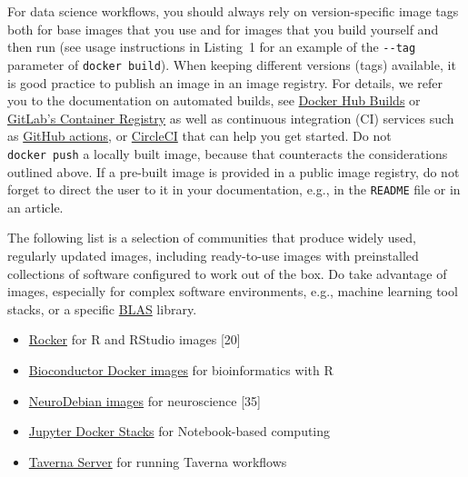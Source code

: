\documentclass[10pt,letterpaper]{article}
\providecommand{\tightlist}{%
  \setlength{\itemsep}{0pt}\setlength{\parskip}{0pt}}
\begin{document}
For data science workflows, you should always rely on version-specific
image tags both for base images that you use and for images that you
build yourself and then run (see usage instructions in Listing~1 for an
example of the \texttt{-\/-tag} parameter of \texttt{docker\ build}).
When keeping different versions (tags) available, it is good practice to
publish an image in an image registry. For details, we refer you to the
documentation on automated builds, see
\href{https://docs.docker.com/docker-hub/builds/}{Docker Hub Builds} or
\href{https://docs.gitlab.com/ee/user/packages/container_registry/index.html\#build-and-push-images}{GitLab's
Container Registry} as well as continuous integration (CI) services such
as
\href{https://github.com/actions/starter-workflows/tree/master/ci}{GitHub
actions}, or
\href{https://circleci.com/orbs/registry/orb/circleci/docker\#commands-build}{CircleCI}
that can help you get started. Do not \texttt{docker\ push} a locally
built image, because that counteracts the considerations outlined above.
If a pre-built image is provided in a public image registry, do not
forget to direct the user to it in your documentation, e.g., in the
\texttt{README} file or in an article.

The following list is a selection of communities that produce widely
used, regularly updated images, including ready-to-use images with
preinstalled collections of software configured to work out of the box.
Do take advantage of images, especially for complex software
environments, e.g., machine learning tool stacks, or a specific
\href{https://en.wikipedia.org/wiki/Basic_Linear_Algebra_Subprograms}{BLAS}
library.

\begin{itemize}
\tightlist
\item
  \href{https://www.rocker-project.org/}{Rocker} for R and RStudio
  images {[}20{]}
\item
  \href{https://bioconductor.org/help/docker/}{Bioconductor Docker
  images} for bioinformatics with R
\item
  \href{https://hub.docker.com/_/neurodebian}{NeuroDebian images} for
  neuroscience {[}35{]}
\item
  \href{https://jupyter-docker-stacks.readthedocs.io/en/latest/index.html}{Jupyter
  Docker Stacks} for Notebook-based computing
\item
  \href{https://hub.docker.com/r/taverna/taverna-server}{Taverna Server}
  for running Taverna workflows
\end{itemize}
\end{document}

